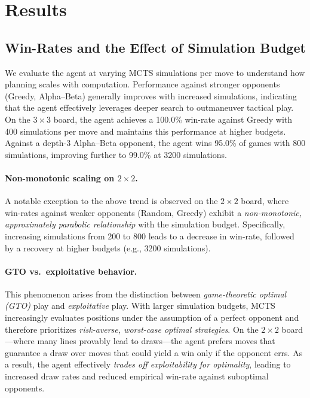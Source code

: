 \documentclass[11pt]{article}
\begin{document}
\section{Results}
\label{sec:results}

\subsection{Win-Rates and the Effect of Simulation Budget}

We evaluate the agent at varying MCTS simulations per move to understand how planning scales with computation. Performance against stronger opponents (Greedy, Alpha--Beta) generally improves with increased simulations, indicating that the agent effectively leverages deeper search to outmaneuver tactical play. On the $3{\times}3$ board, the agent achieves a 100.0\% win-rate against Greedy with 400 simulations per move and maintains this performance at higher budgets. Against a depth-3 Alpha--Beta opponent, the agent wins 95.0\% of games with 800 simulations, improving further to 99.0\% at 3200 simulations.

\paragraph{Non-monotonic scaling on $2{\times}2$.}
A notable exception to the above trend is observed on the $2{\times}2$ board, where win-rates against weaker opponents (Random, Greedy) exhibit a \emph{non-monotonic, approximately parabolic relationship} with the simulation budget. Specifically, increasing simulations from 200 to 800 leads to a decrease in win-rate, followed by a recovery at higher budgets (e.g., 3200 simulations).

\paragraph{GTO vs.\ exploitative behavior.}
This phenomenon arises from the distinction between \emph{game-theoretic optimal (GTO)} play and \emph{exploitative} play. With larger simulation budgets, MCTS increasingly evaluates positions under the assumption of a perfect opponent and therefore prioritizes \emph{risk-averse, worst-case optimal strategies}. On the $2{\times}2$ board—where many lines provably lead to draws—the agent prefers moves that guarantee a draw over moves that could yield a win only if the opponent errs. As a result, the agent effectively \emph{trades off exploitability for optimality}, leading to increased draw rates and reduced empirical win-rate against suboptimal opponents.
\end{document}
